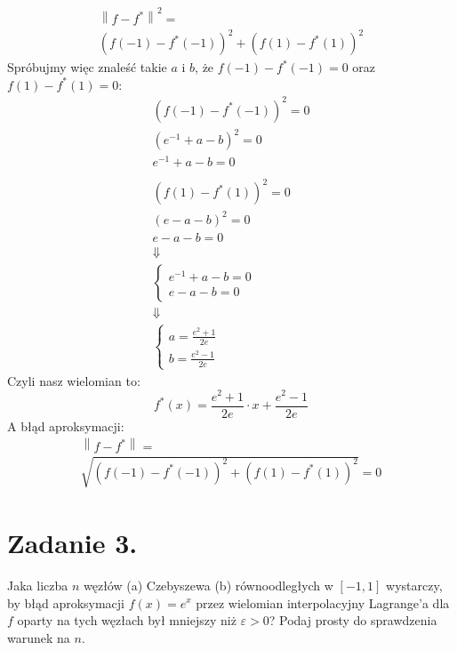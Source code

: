 \documentclass[a4paper]{article}
\newcommand{\eps}{\varepsilon} %
\begin{document}
\begin{itemize}
\begin{gather*}
         \\
         \left\| f - f^{*} \right\|^{2} = \\
         (f(-1) - f^{*}(-1))^{2} + (f(1) - f^{*}(1))^{2}
      \end{gather*}
      Spróbujmy więc znaleść takie $a$ i $b$, że $f(-1) - f^{*}(-1) = 0$ oraz $f(1) - f^{*}(1) = 0$:
      \begin{gather*}
         (f(-1) - f^{*}(-1))^{2} = 0 \\
         (e^{-1} + a - b)^{2} = 0 \\
         e^{-1} + a - b = 0 \\
         \\
         (f(1) - f^{*}(1))^{2} = 0 \\
         (e - a - b)^{2} = 0 \\
         e - a - b = 0 \\
         \Downarrow \\
         \begin{cases}
            e^{-1} + a - b = 0 \\
            e - a - b = 0
         \end{cases}
         \\
         \Downarrow \\
         \begin{cases}
            a = \frac{e^{2} + 1}{2 e} \\
            b = \frac{e^{2} - 1}{2 e}
         \end{cases}
      \end{gather*}
      Czyli nasz wielomian to:
      \[
         f^{*}(x) = \frac{e^{2} + 1}{2 e} \cdot x + \frac{e^{2} - 1}{2 e}
      \]
      A błąd aproksymacji:
      \begin{gather*}
         \left\| f - f^{*} \right\| = \\
         \sqrt{(f(-1) - f^{*}(-1))^{2} + (f(1) - f^{*}(1))^{2}} = 0
      \end{gather*}
   \end{itemize}


   \section*{Zadanie 3.}

   Jaka liczba $n$ węzłów (a) Czebyszewa (b) równoodległych w $[-1, 1]$ wystarczy, by błąd aproksymacji
   $f(x) = e^{x}$ przez wielomian interpolacyjny Lagrange'a dla $f$ oparty na tych węzłach był mniejszy niż $\eps > 0$?
   Podaj prosty do sprawdzenia warunek na $n$.
\end{document}
